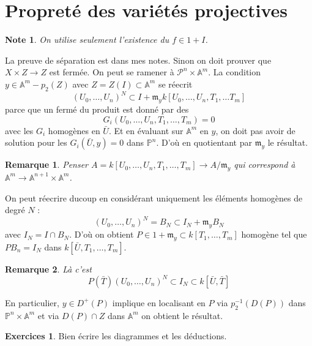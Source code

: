 \documentclass[a4paper,12pt]{book}
\newcommand{\A}{\mathbb{A}}
\newcommand{\m}{\mathfrak{m}}
\renewcommand{\Pr}{\mathbb{P}}
\renewcommand{\P}{\mathscr{P}}
\theoremstyle{plain}
\newtheorem{rem}{Remarque}
\newtheorem{note}{Note}
\theoremstyle{definition}
\newtheorem{exo}[subsection]{Exercices}
\theoremstyle{remark}
\begin{document}
\section{Propreté des variétés projectives}
\begin{note}
    On utilise seulement l'existence du $f\in 1+I$.
\end{note}

La preuve de séparation est dans mes notes. Sinon on doit prouver que
$X\times Z\to Z$ est fermée. On peut se ramener à $\P^n\times \A^m$.
La condition $y\in \A^m-p_2(Z)$ avec $Z=Z(I)\subset \A^m$ se réecrit
\[(U_0,\ldots,U_n)^N\subset I+\m_yk[U_0,\ldots, U_n,T_1,\dots T_m]\]
parce que un fermé du produit est donné par des 
\[G_i(U_0,\ldots, U_n,T_1,\ldots,T_m)=0\]
avec les $G_i$ homogènes en $\bar U$. Et en évaluant sur $\A^m$ en $y$,
on doit pas avoir de solution pour les $G_i(\bar U,y)=0$ dans $\Pr^n$.
D'où en quotientant par $\m_y$ le résultat. 
\begin{rem}
    Penser $A=k[U_0,\ldots, U_n,T_1, \ldots, T_m]\to A/\m_y$ qui 
    correspond à $\A^m\to \A^{n+1}\times \A^m$.
\end{rem}
On peut réecrire ducoup en considérant uniquement les éléments homogènes
de degré $N$ :
\[(U_0,\ldots, U_n)^N=B_N\subset I_N+\m_yB_N\]
avec $I_N=I\cap B_N$. D'où on obtient $P\in 1+\m_y\subset k[T_1,\ldots,
T_m]$ homogène tel que $PB_n=I_N$ dans 
$k[\bar U, T_1,\ldots, T_m]$.
\begin{rem}
    Là c'est 
    \[P(\bar T)(U_0,\ldots, U_n)^N\subset I_N\subset k[\bar U,\bar T]\]
\end{rem}
En particulier, $y\in D^+(P)$ implique en localisant en $P$ via
$p_2^{-1}(D(P))$ dans $\Pr^n\times \A^m$ et via $D(P)\cap Z$ dans 
$\A^m$ on obtient le résultat.
\begin{exo}
     Bien écrire les diagrammes et les déductions.
\end{exo}



\printbibliography
\end{document}
